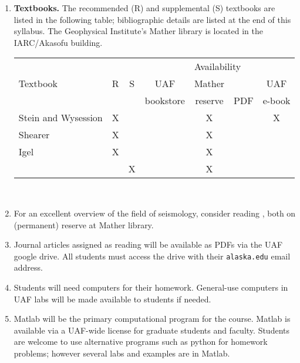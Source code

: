 \documentclass[10pt,titlepage,fleqn]{article}
\begin{document}
\begin{enumerate}
\begin{enumerate}
\item {\bf Textbooks.} The recommended (R) and supplemental (S) textbooks are listed in the following table; bibliographic details are listed at the end of this syllabus.
The  Geophysical Institute's Mather library is located in the IARC/Akasofu building.

\begin{tabular}{l|c|c|c|c|c|c}
\hline
     &          & & \multicolumn{4}{c}{Availability}    \\ \cline{4-7}
Textbook & R & S  & UAF       & Mather  &     & UAF     \\
     &          &           & bookstore & reserve & PDF & e-book  \\ \hline
\cite{SteinWysession} Stein and Wysession   & X &      & & X & & X \\ \hline
\cite{ShearerE2} Shearer                    & X &      & & X & & \\ \hline
\cite{Igel} Igel                            & X &      & & X & & \\ \hline
\cite{KennettV1,KennettV2,DT,LayWallace1995,AkiRichardsE2,Malvern,AsterE2,Fichtner} & & X & & X & & \\ \hline
\end{tabular} \\

\item For an excellent overview of the field of seismology, consider reading \cite{WHKLeeA,WHKLeeB}, both on (permanent) reserve at Mather library.

\item Journal articles assigned as reading will be available as PDFs via the UAF google drive. All students must access the drive with their \verb+alaska.edu+ email address.

\item Students will need computers for their homework. General-use computers in UAF labs will be made available to students if needed.

\item Matlab will be the primary computational program for the course.
Matlab is available via a UAF-wide license for graduate students and faculty.
Students are welcome to use alternative programs such as python for homework problems; however several labs and examples are in Matlab.


\end{enumerate}
\end{enumerate}
\end{document}
